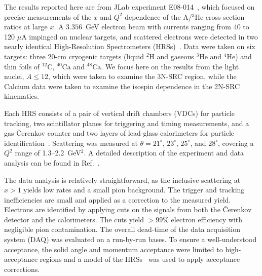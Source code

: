 \documentclass[aps,prl,superscriptaddress,showpacs,twocolumn,floatfix,amsmath,amssymb]{revtex4-1}
\begin{document}



The results reported here are from JLab experiment E08-014~\cite{e08014_pr}, which focused on precise
measurements of the $x$ and $Q^2$ dependence of the A/$^3$He cross section ratios at large $x$. A $3.356$~GeV
electron beam with currents ranging from 40 to 120 $\mu$A impinged on nuclear targets, and scattered
electrons were detected in two nearly identical High-Resolution Spectrometers (HRSs)~\cite{halla_nim}. Data
were taken on six targets: three 20-cm cryogenic targets (liquid $^2$H and gaseous $^3$He and $^4$He) and
thin foils of $\mathrm{^{12}C}$, $\mathrm{^{40}Ca}$ and $\mathrm{^{48}Ca}$. We focus here on the results from
the light nuclei, $A \leq 12$, which were taken to examine the 3N-SRC region, while the Calcium data were
taken to examine the isospin dependence in the 2N-SRC kinematics.

Each HRS consists of a pair of vertical drift chambers (VDCs) for particle tracking, two scintillator planes
for triggering and timing measurements, and a gas \v{C}erenkov counter and two layers of lead-glass
calorimeters for particle identification~\cite{halla_nim}. Scattering was measured at $\theta=21^\circ$,
$23^\circ$, $25^\circ$, and $28^\circ$, covering a $Q^2$ range of 1.3--2.2~GeV$^2$. A detailed description
of the experiment and data analysis can be found in Ref.~\cite{zye_thesis}.



The data analysis is relatively straightforward, as the inclusive scattering at $x>1$ yields low rates and a
small pion background. The trigger and tracking inefficiencies are small and applied as a correction to the
measured yield. Electrons are identified by applying cuts on the signals from both the \v{C}erenkov detector
and the calorimeters. The cuts yield $>99$\% electron efficiency with negligible pion contamination. The
overall dead-time of the data acquisition system (DAQ) was evaluated on a run-by-run bases. To ensure a
well-understood acceptance, the solid angle and momentum acceptance were limited to high-acceptance regions
and a model of the HRSs~\cite{zye_thesis} was used to apply acceptance corrections.
\end{document}
